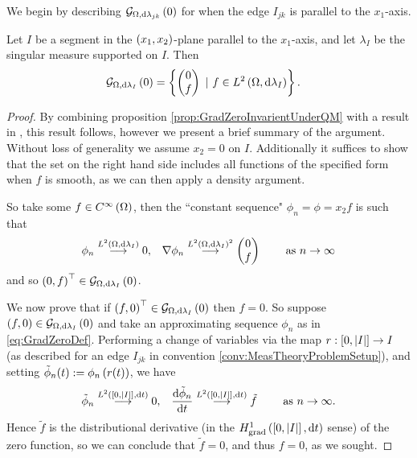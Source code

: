 We begin by describing $\mathcal{G}_{ \Omega, \mathrm{d}\lambda_{jk}}\left( 0 \right)$ for when the edge $I_{jk}$ is parallel to the $x_1$-axis.
\begin{prop} \label{prop:GradZeroParallelZhikov}
	Let $I$ be a segment in the $\left( x_1,x_2 \right)$-plane parallel to the $x_1$-axis, and let $\lambda_I$ be the singular measure supported on $I$.
	Then 
	\begin{align*}
		\mathcal{G}_{ \Omega, \mathrm{d}\lambda_I}\left( 0 \right) &= 
		\left\{ 
			\begin{pmatrix} 0 \\ f	\end{pmatrix}
			\ \vert \ f\in L^{2}\left( \Omega,\mathrm{d}\lambda_I \right)
		 \right\}.
	\end{align*}
\end{prop}
\begin{proof}
	By combining proposition \ref{prop:GradZeroInvarientUnderQM} with a result in \cite{zhikov2000extension} , this result follows, however we present a brief summary of the argument.
	Without loss of generality we assume $x_2=0$ on $I$.
	Additionally it suffices to show that the set on the right hand side includes all functions of the specified form when $f$ is smooth, as we can then apply a density argument. \newline
	
	So take some $f\in C^{\infty}\left( \Omega \right)$, then the ``constant sequence" $\phi_n = \phi = x_2 f$ is such that
	\begin{align*}
		\phi_n\overset{L^{2}\left( \Omega,\mathrm{d}\lambda_I \right)}{\longrightarrow}0, 
		&\quad \nabla\phi_n\overset{L^{2}\left( \Omega,\mathrm{d}\lambda_I \right)^2}{\longrightarrow} \begin{pmatrix} 0 \\ f \end{pmatrix}
		&\quad \ \text{as} \ n \rightarrow\infty
	\end{align*}	 
	and so $\left( 0,f \right)^\top\in\mathcal{G}_{ \Omega, \mathrm{d}\lambda_I}\left( 0 \right)$. \newline
	
	We now prove that if $\left( f,0 \right)^\top\in\mathcal{G}_{ \Omega, \mathrm{d}\lambda_I}\left( 0 \right)$ then $f=0$.
	So suppose $\left( f,0 \right)\in\mathcal{G}_{ \Omega, \mathrm{d}\lambda_I}\left( 0 \right)$ and take an approximating sequence $\phi_n$ as in \eqref{eq:GradZeroDef}.
	Performing a change of variables via the map $r:\left[ 0,\left\lvert I \right\rvert \right]\rightarrow I$ (as described for an edge $I_{jk}$ in convention \ref{conv:MeasTheoryProblemSetup}), and setting $\tilde{\phi}_n(t) := \phi_n\left( r(t) \right)$, we have
	\begin{align*}
		\tilde{\phi}_n\overset{L^{2}\left( \left[ 0,\left\lvert I \right\rvert \right],\mathrm{d}t \right)}{\longrightarrow} 0, 
		&\quad \dfrac{\mathrm{d}\tilde{\phi}_n}{\mathrm{d}t}\overset{L^{2}\left( \left[ 0,\left\lvert I \right\rvert \right],\mathrm{d}t \right)}{\longrightarrow} \tilde{f}
		&\quad \ \text{as} \ n \rightarrow\infty.
	\end{align*}
	Hence $\tilde{f}$ is the distributional derivative (in the $H^1_\mathrm{grad}\left( \left[ 0,\left\lvert I \right\rvert \right], \mathrm{d}t \right)$ sense) of the zero function, so we can conclude that $\tilde{f} = 0$, and thus $f = 0$, as we sought.
\end{proof}

